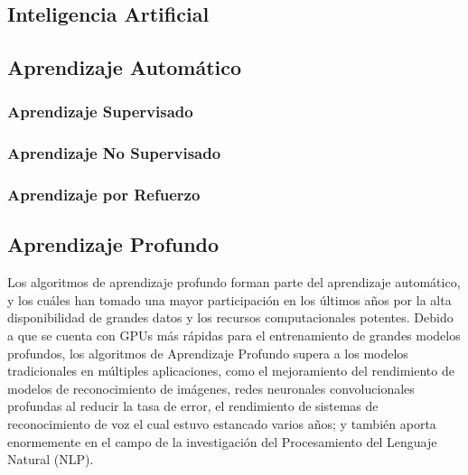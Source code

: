 

 
\subsection{Inteligencia Artificial}

\subsection{Aprendizaje Automático}
\subsubsection{Aprendizaje Supervisado}
\subsubsection{Aprendizaje No Supervisado}
\subsubsection{Aprendizaje por Refuerzo}

\subsection{Aprendizaje Profundo}
Los algoritmos de aprendizaje profundo forman parte del aprendizaje automático, y los cuáles han tomado una mayor participación en los últimos años por la alta disponibilidad de grandes datos y los recursos computacionales potentes. Debido a que se cuenta con GPUs más rápidas para el entrenamiento de grandes modelos profundos, los algoritmos de Aprendizaje Profundo supera a los modelos tradicionales en múltiples aplicaciones, como el mejoramiento del rendimiento de modelos de reconocimiento de imágenes, redes neuronales convolucionales profundas al reducir la tasa de error, el rendimiento de sistemas de reconocimiento de voz el cual estuvo estancado varios años; y también aporta enormemente en el campo de la investigación del Procesamiento del Lenguaje Natural (NLP).


